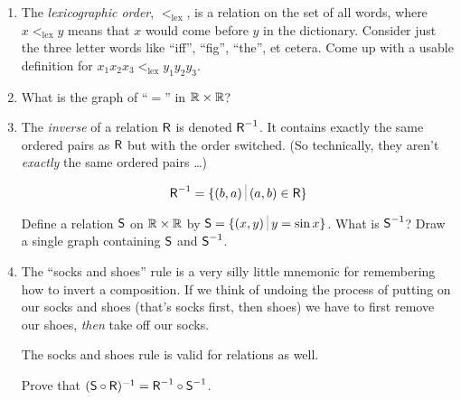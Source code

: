\begin{enumerate}
\item The \emph{lexicographic order}, 
$<_{\mbox{lex}}$, is a relation on the
set of all words, where $x <_{\mbox{lex}} y$ means that $x$ would come before
$y$ in the dictionary.  Consider just the three letter words like ``iff'',
``fig'', ``the'', et cetera.  Come up with a usable definition for
$x_1x_2x_3  <_{\mbox{lex}} y_1y_2y_3$.

\wbvfill

\workbookpagebreak

\item What is the graph of ``$=$'' in ${\mathbb R} \times {\mathbb R}$?

\wbvfill


\item The  \emph{inverse} of a relation $\mbox{\textsf R}$
is denoted $\mbox{\textsf R}^{-1}$.  It contains exactly the same ordered pairs
as $\mbox{\textsf R}$ but with the order switched.  (So technically, they aren't
\emph{exactly} the same ordered pairs \ldots)

\[ \relR^{-1} = \{ (b,a) \suchthat (a,b) \in \relR \} \]

\noindent Define a relation $\mbox{\textsf S}$ on ${\mathbb R} \times {\mathbb R}$ by
$\relS = \{ (x,y) \suchthat y = \sin x \}$.  What is $\mbox{\textsf S}^{-1}$?
Draw a single graph containing $\mbox{\textsf S}$ and $\mbox{\textsf S}^{-1}$.

\wbvfill

\rule{0pt}{0pt}

\wbvfill

\workbookpagebreak


\item The ``socks and shoes'' rule is a very silly little mnemonic
for remembering how to invert a composition.  If we think of undoing
the process of putting on our socks and shoes (that's socks first, then
shoes) we have to first remove our shoes, \emph{then} take off our socks.

The socks and shoes rule is valid for relations as well.

Prove that $(\mbox{\textsf S} \circ \mbox{\textsf R})^{-1} = \mbox{\textsf R}^{-1} \circ \mbox{\textsf S}^{-1}$.

\wbvfill

\workbookpagebreak

\end{enumerate} 

